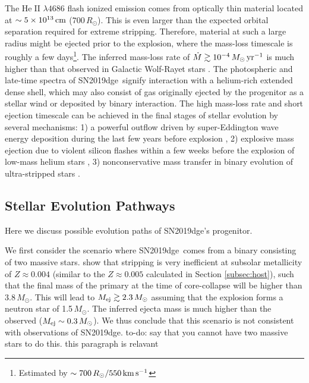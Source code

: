 \documentclass[twocolumn]{aastex63}
\newcommand{\name}{SN2019dge}
\def\ion#1#2{#1$\;${\footnotesize\rm{#2}}\relax}
\newcommand{\todo}[1]{{\color{magenta} to-do: {#1}}}
\begin{document}
\begin{CJK*}{UTF8}{gbsn}
The \ion{He}{II} $\lambda4686$ flash ionized emission comes from optically thin material located at 
$\sim 5\times 10^{13}\,{\rm cm}$ ($700\,R_\odot$). This is even larger than the expected orbital 
separation required for extreme stripping. Therefore, material at such a large radius might be ejected 
prior to the explosion, where the mass-loss timescale is roughly a few days\footnote{Estimated by 
$\sim700\,R_\odot/ 550\,{\rm km\,s^{-1}}$}. The inferred mass-loss rate of $\dot M \gtrsim 10^{-4}\,{ 
M_\odot}\, \rm yr^{-1}$ is much higher than that observed in Galactic Wolf-Rayet stars 
\citep{Smith2014}. The photospheric and late-time spectra of \name\ signify 
interaction with a helium-rich extended dense shell, which may also consist of gas originally ejected by 
the progenitor as a stellar wind or deposited by binary interaction. The high mass-loss rate and 
short ejection timescale can be achieved in the final stages of stellar evolution by several mechanisms: 
1) a powerful outflow driven by super-Eddington wave energy deposition
during the last few years before explosion \citep{Quataert2012}, 2) explosive mass ejection due to 
violent silicon flashes within a few weeks before the explosion of low-mass helium stars 
\citep{Woosley2019}, 3) nonconservative 
mass transfer in binary evolution of ultra-stripped stars \citep{Tauris2015}. 


\subsection{Stellar Evolution Pathways} \label{subsec:stellar_pathways}
Here we discuss possible evolution paths of \name's progenitor.

We first consider the scenario where \name\ comes from a binary consisting of two massive stars. 
\citet{Yoon2010} show that stripping is very inefficient at subsolar metallicity of $Z\approx 0.004$ 
(similar to the $Z\approx 0.005$ calculated in Section \ref{subsec:host}), such that the final mass of 
the primary at the time of core-collapse will be higher than 3.8\,$M_\odot$. This will lead to $M_{\rm 
ej}\gtrsim 2.3\,M_\odot$ assuming that the explosion forms a neutron star of 1.5\,$M_\odot$. The 
inferred ejecta mass is much higher than the observed ($M_{\rm ej}\sim 0.3 \, M_\odot$). We thus 
conclude that this scenario is not consistent with observations of \name. \todo{say that you cannot 
have two massive stars to do this. this paragraph is relavant}


\end{CJK*}
\end{document}
